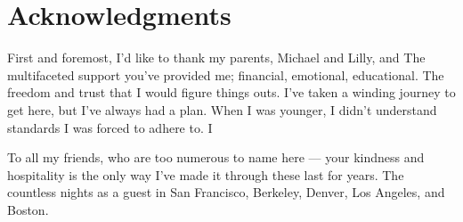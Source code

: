 \documentclass[11pt, oneside, openany]{scrbook}
\begin{document}
\newpage
\section*{Acknowledgments}
First and foremost, I'd like to thank my parents, Michael and Lilly, and  The multifaceted support you've provided me; financial, emotional, educational. The freedom and trust that I would figure things outs. I've taken a winding journey to get here, but I've always had a plan. When I was younger, I didn't understand standards I was forced to adhere to. I

To all my friends, who are too numerous to name here --- your kindness and hospitality is the only way I've made it through these last for years. The countless nights as a guest in San Francisco, Berkeley, Denver, Los Angeles, and Boston.



\setcounter{tocdepth}{1}

\tableofcontents

\listoftables

\listoffigures
\mainmatter




\backmatter
\end{document}
